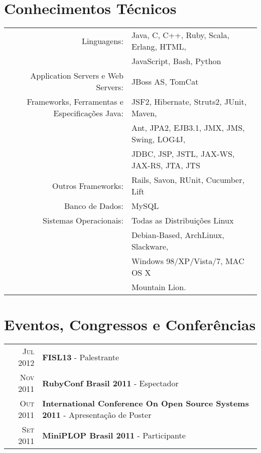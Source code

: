 \documentclass[a4paper,10pt]{article} %
\begin{document}
\section{Conhecimentos Técnicos}

\begin{tabular}{r|p{11cm}}
Linguagens: & Java, C, C++, Ruby, Scala, Erlang, HTML,\\& JavaScript, Bash, Python\multicolumn{2}{c}{} \\

Application Servers e Web Servers: & JBoss AS, TomCat\multicolumn{2}{c}{} \\

Frameworks, Ferramentas e Especificações Java: & JSF2, Hibernate, Struts2, JUnit, Maven,\\& Ant, JPA2, EJB3.1, JMX, JMS, Swing, LOG4J,\\& JDBC, JSP, JSTL, JAX-WS, JAX-RS, JTA, JTS\multicolumn{2}{c}{} \\

Outros Frameworks: & Rails, Savon, RUnit, Cucumber, Lift\multicolumn{2}{c}{} \\

Banco de Dados: & MySQL\multicolumn{2}{c}{} \\

Sistemas Operacionais: & Todas as Distribuições Linux \\&Debian-Based, ArchLinux, Slackware, \\&Windows 98/XP/Vista/7, MAC OS X\\& Mountain Lion.\\


\end{tabular}


\section{Eventos, Congressos e Conferências}

\begin{tabular}{rl}
\textsc{Jul} 2012 & \textbf{FISL13} - Palestrante\\

\textsc{Nov} 2011 & \textbf{RubyConf Brasil 2011} - Espectador\\
\textsc{Out} 2011 & \textbf{International Conference On Open Source Systems 2011} - Apresentação de Poster\\
\textsc{Set} 2011 & \textbf{MiniPLOP Brasil 2011} - Participante

\end{tabular}
\end{document}
